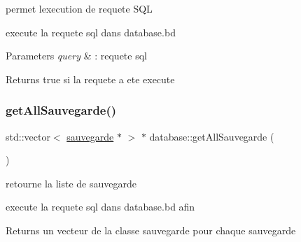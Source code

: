 permet l\textquotesingle{}execution de requete S\+QL 

execute la requete sql dans database.\+bd 
\begin{DoxyParams}{Parameters}
{\em query} & \+: requete sql \\
\hline
\end{DoxyParams}
\begin{DoxyReturn}{Returns}
true si la requete a ete execute 
\end{DoxyReturn}
\mbox{\label{classdatabase_abf69b9f69151bd9697365b9d69026273}} 
\subsubsection{\texorpdfstring{get\+All\+Sauvegarde()}{getAllSauvegarde()}}
{\footnotesize\ttfamily std\+::vector$<$ \mbox{\hyperlink{classsauvegarde}{sauvegarde}} $\ast$ $>$ $\ast$ database\+::get\+All\+Sauvegarde (\begin{DoxyParamCaption}{ }\end{DoxyParamCaption})}



retourne la liste de sauvegarde 

execute la requete sql dans database.\+bd afin

\begin{DoxyReturn}{Returns}
un vecteur de la classe sauvegarde pour chaque sauvegarde 
\end{DoxyReturn}
\mbox{\label{classdatabase_a287490545fa5fe82219162c6254abbfc}} 
